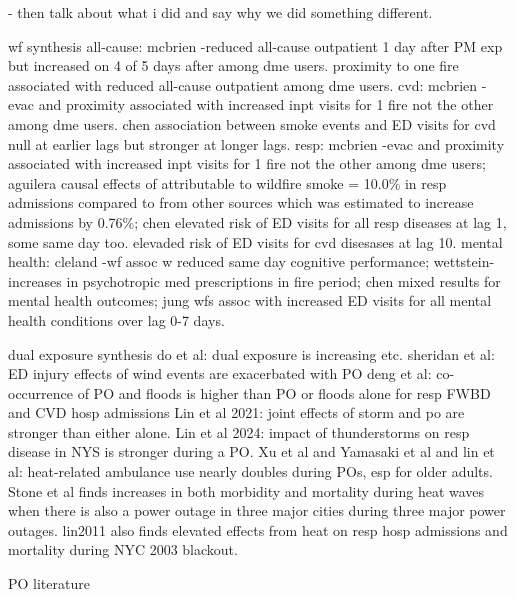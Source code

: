 - then talk about what i did and say why we did something different.

wf synthesis
all-cause: mcbrien -reduced all-cause outpatient 1 day after PM exp but increased on 4 of 5 days after among dme users. proximity to one fire associated with reduced all-cause outpatient among dme users.
cvd: mcbrien -evac and proximity associated with increased inpt visits for 1 fire not the other among dme users. chen association between smoke events and ED visits for cvd null at earlier lags but stronger at longer lags.
resp: mcbrien -evac and proximity associated with increased inpt visits for 1 fire not the other among dme users; aguilera causal effects of \PM attributable to wildfire smoke = 10.0\% in resp admissions compared to \PM from other sources which was estimated to increase admissions by 0.76\%; chen elevated risk of ED visits for all resp diseases at lag 1, some same day too. elevaded risk of ED visits for cvd disesases at lag 10. 
mental health: cleland -wf \PM assoc w reduced same day cognitive performance; wettstein-increases in psychotropic med prescriptions in fire period; chen mixed results for mental health outcomes; jung wfs assoc with increased ED visits for all mental health conditions over lag 0-7 days.


dual exposure synthesis
do et al: dual exposure is increasing etc.
sheridan et al: ED injury effects of wind events are exacerbated with PO
deng et al: co-occurrence of PO and floods is higher than PO or floods alone for resp FWBD and CVD hosp admissions
Lin et al 2021: joint effects of storm and po are stronger than either alone. 
Lin et al 2024: impact of thunderstorms on resp disease in NYS is stronger during a PO. 
Xu et al and Yamasaki et al and lin et al: heat-related ambulance use nearly doubles during POs, esp for older adults. Stone et al finds increases in both morbidity and mortality during heat waves when there is also a power outage in three major cities during three major power outages. lin2011 also finds elevated effects from heat on resp hosp admissions and mortality during NYC 2003 blackout.



PO literature
\citep{casey2020power, northrop2024power, lin2021immediate, mcbrien2025, molinari2017s, do2025impact, zhang2020power, dominianni2018health, xiao2019immediate, ibrahim2016erratic, moreno2019community, skarha2021association, andresen2023understanding, lin2024joint, anderson2011impacts, yamasaki2024heat}

